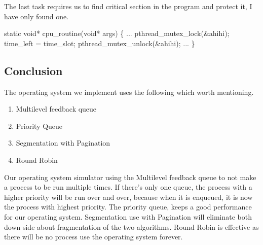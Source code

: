 \documentclass[]{article}
\newenvironment{Shaded}{}{}
\newcommand{\DataTypeTok}[1]{\textcolor[rgb]{0.56,0.13,0.00}{#1}}
\newcommand{\NormalTok}[1]{#1}
\providecommand{\tightlist}{%
  \setlength{\itemsep}{0pt}\setlength{\parskip}{0pt}}
\begin{document}
The last task requires us to find critical section in the program and
protect it, I have only found one.

\begin{Shaded}
\begin{Highlighting}[]
\DataTypeTok{static} \DataTypeTok{void}\NormalTok{* cpu_routine(}\DataTypeTok{void}\NormalTok{* args) \{}
\NormalTok{    ...}
\NormalTok{        pthread_mutex_lock(&ahihi);}
\NormalTok{    time_left = time_slot;}
\NormalTok{    pthread_mutex_unlock(&ahihi);}
\NormalTok{    ...}
\NormalTok{\}}
\end{Highlighting}
\end{Shaded}

\subsection{Conclusion}\label{conclusion}

The operating system we implement uses the following which worth
mentioning.

\begin{enumerate}
\def\labelenumi{\arabic{enumi}.}
\tightlist
\item
  Multilevel feedback queue
\item
  Priority Queue
\item
  Segmentation with Pagination
\item
  Round Robin
\end{enumerate}

Our operating system simulator using the Multilevel feedback queue to
not make a process to be run multiple times. If there's only one queue,
the process with a higher priority will be run over and over, because
when it is enqueued, it is now the process with highest priority. The
priority queue, keeps a good performance for our operating system.
Segmentation use with Pagination will eliminate both down side about
fragmentation of the two algorithms. Round Robin is effective as there
will be no process use the operating system forever.
\end{document}
